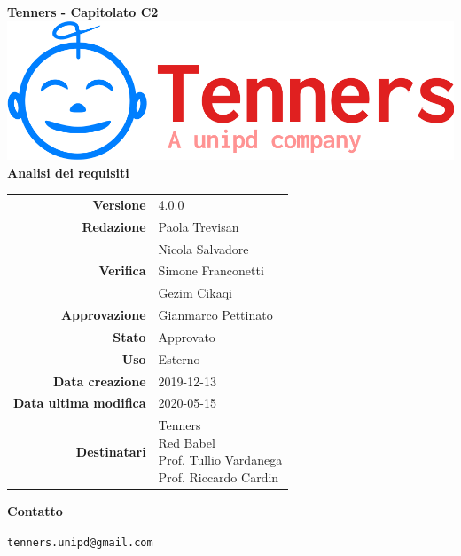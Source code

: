 \begin{titlepage}
	\begin{center}
		\large \textbf{Tenners - Capitolato C2}
		\vfill
		\includegraphics[scale = 0.3]{./res/img/logo.png}\\
		\vfill
		\Huge \textbf{Analisi dei requisiti}

        \vfill
        \large

        \begin{tabular}{r|l}
                        \textbf{Versione} & 4.0.0 \\
                        \textbf{Redazione} &
                        Paola Trevisan \\&
						Nicola Salvadore \\
                        \textbf{Verifica} &
                        Simone Franconetti\\&
                        Gezim Cikaqi\\
                        \textbf{Approvazione} & Gianmarco Pettinato \\
                        \textbf{Stato} & Approvato \\
                        \textbf{Uso} & Esterno\\
                        \textbf{Data creazione} & 2019-12-13\\
                        \textbf{Data ultima modifica} & 2020-05-15\\
                        \textbf{Destinatari} & \parbox[t]{5cm}{Tenners\\Red Babel\\Prof. Tullio Vardanega\\Prof. Riccardo Cardin}
                \end{tabular}
                \vfill
                \normalsize
                \vfill
                \textbf{Contatto}

                \texttt{tenners.unipd@gmail.com}

	\end{center}
\end{titlepage}
